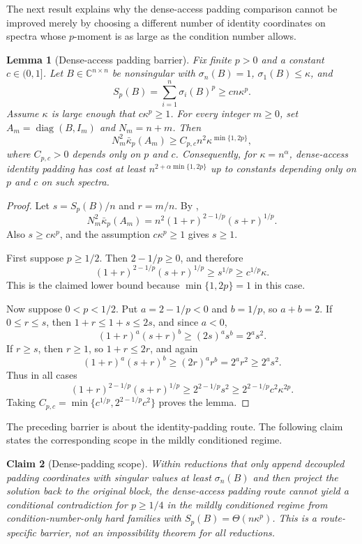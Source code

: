 \documentclass[11pt]{article}
\newtheorem{lemma}{Lemma}[section]
\newtheorem{claim}[lemma]{Claim}
\begin{document}
The next result explains why the dense-access padding comparison cannot be
improved merely by choosing a different number of identity coordinates on
spectra whose $p$-moment is as large as the condition number allows.

\begin{lemma}[Dense-access padding barrier]
\label{lem:dense-padding-optimization-barrier}
Fix finite $p>0$ and a constant $c\in(0,1]$.  Let
$B\in\mathbb{C}^{n\times n}$ be nonsingular with $\sigma_n(B)=1$,
$\sigma_1(B)\leq\kappa$, and
\[
  S_p(B)=\sum_{i=1}^n \sigma_i(B)^p\geq c n\kappa^p.
\]
Assume $\kappa$ is large enough that $c\kappa^p\geq1$.  For every integer
$m\geq0$, set $A_m=\operatorname{diag}(B,I_m)$ and $N_m=n+m$.  Then
\[
  N_m^2\bar{\kappa}_p(A_m)
  \geq
  C_{p,c} n^2\kappa^{\min\{1,2p\}},
\]
where $C_{p,c}>0$ depends only on $p$ and $c$.  Consequently, for
$\kappa=n^{\alpha}$, dense-access identity padding has cost at least
$n^{2+\alpha\min\{1,2p\}}$ up to constants depending only on $p$ and $c$ on
such spectra.
\end{lemma}

\begin{proof}
Let $s=S_p(B)/n$ and $r=m/n$.  By ,
\[
  N_m^2\bar{\kappa}_p(A_m)
  =
  n^2(1+r)^{2-1/p}(s+r)^{1/p}.
\]
Also $s\geq c\kappa^p$, and the assumption $c\kappa^p\geq1$ gives $s\geq1$.

First suppose $p\geq1/2$.  Then $2-1/p\geq0$, and therefore
\[
  (1+r)^{2-1/p}(s+r)^{1/p}
  \geq
  s^{1/p}
  \geq
  c^{1/p}\kappa.
\]
This is the claimed lower bound because $\min\{1,2p\}=1$ in this case.

Now suppose $0<p<1/2$.  Put $a=2-1/p<0$ and $b=1/p$, so $a+b=2$.  If
$0\leq r\leq s$, then $1+r\leq1+s\leq2s$, and since $a<0$,
\[
  (1+r)^a(s+r)^b
  \geq
  (2s)^a s^b
  =
  2^a s^2.
\]
If $r\geq s$, then $r\geq1$, so $1+r\leq2r$, and again
\[
  (1+r)^a(s+r)^b
  \geq
  (2r)^a r^b
  =
  2^a r^2
  \geq
  2^a s^2.
\]
Thus in all cases
\[
  (1+r)^{2-1/p}(s+r)^{1/p}
  \geq
  2^{2-1/p}s^2
  \geq
  2^{2-1/p}c^2\kappa^{2p}.
\]
Taking $C_{p,c}=\min\{c^{1/p},2^{2-1/p}c^2\}$ proves the lemma.
\end{proof}

The preceding barrier is about the identity-padding route.  The following
claim states the corresponding scope in the mildly conditioned regime.

\begin{claim}[Dense-padding scope]
\label{clm:dense-padding-scope}
Within reductions that only append decoupled padding coordinates with singular
values at least $\sigma_n(B)$ and then project the solution back to the
original block, the dense-access padding route cannot yield a conditional
contradiction for $p\geq1/4$ in the mildly conditioned regime from
condition-number-only hard families with $S_p(B)=\Theta(n\kappa^p)$.  This is
a route-specific barrier, not an impossibility theorem for all reductions.
\end{claim}
\end{document}
